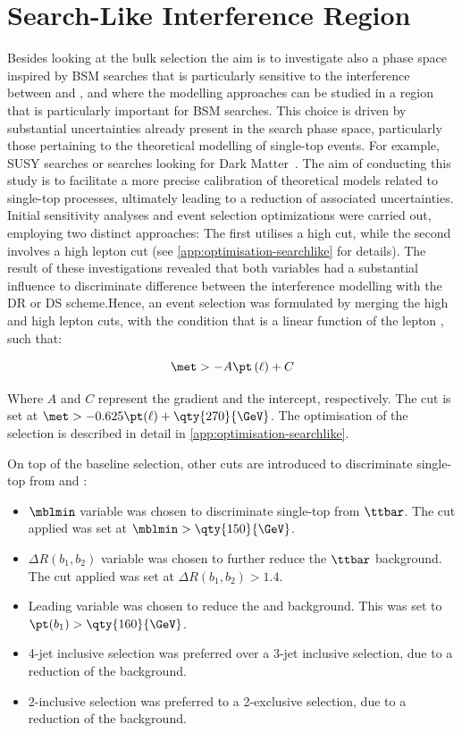 \FloatBarrier


\section{Search-Like Interference Region}%
\label{sec:regions-search}

Besides looking at the bulk selection the aim is to investigate also
a phase space inspired by BSM searches that is particularly sensitive
to the interference between \ttbar and \tW, and where the modelling
approaches can be studied in a region that is particularly
important for BSM searches.
This choice is driven by substantial uncertainties already present
in the search phase space, particularly those pertaining to the theoretical
modelling of single-top events. For example, SUSY searches or searches looking
for Dark Matter~\cite{EXOT-2021-01}. The aim of conducting this study is
to facilitate a more precise calibration of theoretical models related
to single-top processes, ultimately leading to a reduction of associated
uncertainties.
Initial sensitivity analyses and event selection optimizations were carried out,
employing two distinct approaches:
The first utilises a high \met cut, while the second involves a high lepton
\pt cut (see \cref{app:optimisation-searchlike} for details).
The result of these investigations revealed that both variables had a substantial
influence to discriminate difference between the interference
modelling with the DR or DS scheme.\@ Hence, an event selection was
formulated by merging the high \met and high lepton \pt cuts, with the condition
that \met is a linear function of the lepton \pt, such that:

\begin{equation}
  \met > -A\pt\left(\ell\right) + C
\end{equation}

Where \(A\) and \(C\) represent the gradient and the intercept, respectively.
The cut is set at \( \met > -0.625\pt(\ell) + \qty{270}{\GeV} \).
The optimisation of the selection is described in detail
in \cref{app:optimisation-searchlike}.

On top of the baseline selection, other cuts are introduced to discriminate
single-top from \ttbar and \Wjets:
\begin{itemize}
  \item  \( \mblmin \) variable was chosen to discriminate single-top from \( \ttbar \). The cut applied was set at \( \mblmin > \qty{150}{\GeV} \).
  \item \( \Delta R (b_{1}, b_{2}) \) variable was chosen to further reduce the \(\ttbar \) background. The cut applied was set at \( \Delta R (b_{1}, b_{2})  > 1.4\).
  \item Leading \bjet \pt variable was chosen to reduce the \ttbar and \Wjets background. This was set to \( \pt(b_{1}) > \qty{160}{\GeV} \).
  \item 4-jet inclusive selection was preferred over a 3-jet inclusive selection, due to a reduction of the \Wjets background.
  \item 2-\bjet inclusive selection was preferred to a 2-\bjet exclusive selection, due to a reduction of the \Wjets background.
\end{itemize}

